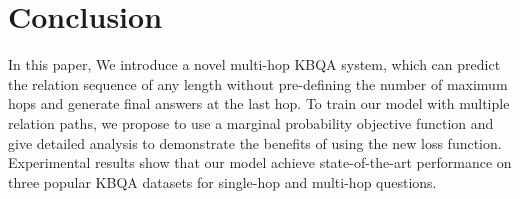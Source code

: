 \section{Conclusion}

In this paper, We introduce a novel multi-hop KBQA system, which can predict the relation sequence of any length without pre-defining the number of maximum hops and generate final answers at the last hop. To train our model with multiple relation paths, we propose to use a marginal probability objective function and give detailed analysis to demonstrate the benefits of using the new loss function. Experimental results show that our model achieve state-of-the-art performance on three popular KBQA datasets for single-hop and multi-hop questions.